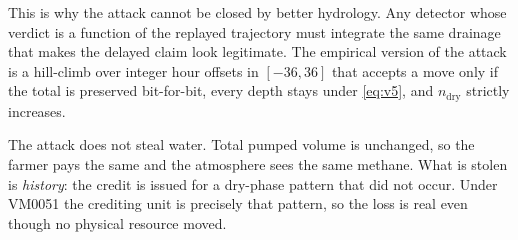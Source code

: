 This is why the attack cannot be closed by better hydrology. Any detector whose
verdict is a function of the replayed trajectory must integrate the same
drainage that makes the delayed claim look legitimate. The empirical version of
the attack is a hill-climb over integer hour offsets in $[-36,36]$ that accepts a
move only if the total is preserved bit-for-bit, every depth stays under
\eqref{eq:v5}, and $n_{\mathrm{dry}}$ strictly increases.

\begin{remark}
The attack does not steal water. Total pumped volume is unchanged, so the farmer
pays the same and the atmosphere sees the same methane. What is stolen is
\emph{history}: the credit is issued for a dry-phase pattern that did not occur.
Under VM0051 the crediting unit is precisely that pattern, so the loss is real
even though no physical resource moved.
\end{remark}
